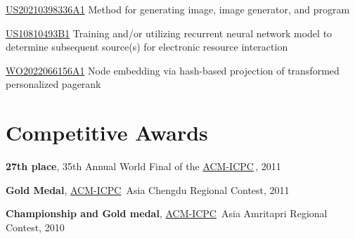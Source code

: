 \documentclass[line,margin]{cv}
\newcommand{\myemph}{\textbf}
\newcommand{\ICPC}{\href{https://icpc.global/}{ACM-ICPC}}
\begin{document}
\begin{resume}
  \href{https://patents.google.com/patent/US20210398336A1}{US20210398336A1} Method for generating image, image generator, and program

  \href{https://patents.google.com/patent/US10810493B1}{US10810493B1} Training and/or utilizing recurrent neural network model to determine subsequent source(s) for electronic resource interaction

  \href{https://patents.google.com/patent/WO2022066156A1}{WO2022066156A1} Node embedding via hash-based projection of transformed personalized pagerank


\section{Competitive Awards}


  \myemph{27th place}, 35th Annual World Final of the \ICPC \,, 2011

  \myemph{Gold Medal}, \ICPC\ Asia Chengdu Regional Contest, 2011

  \myemph{Championship and Gold medal}, \ICPC\ Asia Amritapri Regional Contest, 2010

\end{resume}
\end{document}
